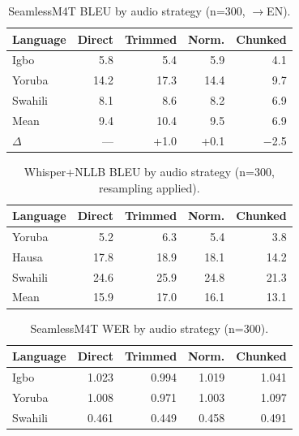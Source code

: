 
\begin{table}[t]
\centering
\small
\caption{SeamlessM4T BLEU by audio strategy (n=300, $\to$EN).}
\label{tab:p3_full_bleu}
\begin{tabular}{lrrrr}
\toprule
\textbf{Language} & \textbf{Direct} & \textbf{Trimmed} & \textbf{Norm.} & \textbf{Chunked} \\
\midrule
Igbo    &  5.8 &  5.4 &  5.9 &  4.1 \\
Yoruba  & 14.2 & 17.3 & 14.4 &  9.7 \\
Swahili &  8.1 &  8.6 &  8.2 &  6.9 \\
\midrule
Mean    &  9.4 & 10.4 &  9.5 &  6.9 \\
$\Delta$ & — & +1.0 & +0.1 & $-$2.5 \\
\bottomrule
\end{tabular}
\end{table}

\begin{table}[t]
\centering
\small
\caption{Whisper+NLLB BLEU by audio strategy (n=300, resampling applied).}
\label{tab:p3_cascade_bleu}
\begin{tabular}{lrrrr}
\toprule
\textbf{Language} & \textbf{Direct} & \textbf{Trimmed} & \textbf{Norm.} & \textbf{Chunked} \\
\midrule
Yoruba  &  5.2 &  6.3 &  5.4 &  3.8 \\
Hausa   & 17.8 & 18.9 & 18.1 & 14.2 \\
Swahili & 24.6 & 25.9 & 24.8 & 21.3 \\
\midrule
Mean    & 15.9 & 17.0 & 16.1 & 13.1 \\
\bottomrule
\end{tabular}
\end{table}

\begin{table}[t]
\centering
\small
\caption{SeamlessM4T WER by audio strategy (n=300).}
\label{tab:p3_full_wer}
\begin{tabular}{lrrrr}
\toprule
\textbf{Language} & \textbf{Direct} & \textbf{Trimmed} & \textbf{Norm.} & \textbf{Chunked} \\
\midrule
Igbo    & 1.023 & 0.994 & 1.019 & 1.041 \\
Yoruba  & 1.008 & 0.971 & 1.003 & 1.097 \\
Swahili & 0.461 & 0.449 & 0.458 & 0.491 \\
\bottomrule
\end{tabular}
\end{table}
